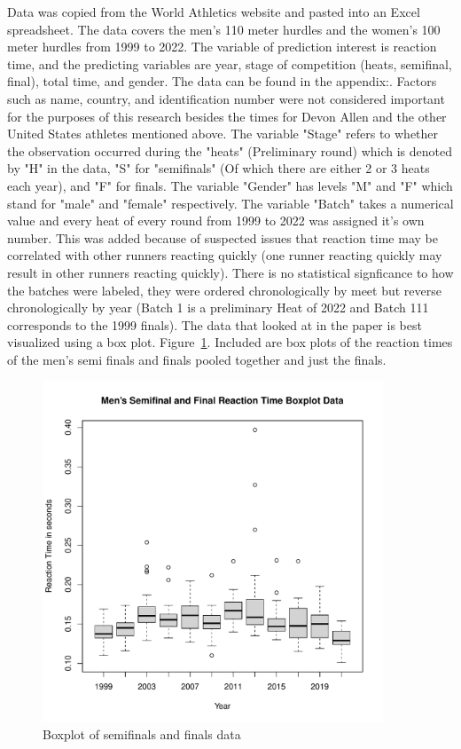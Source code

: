 \documentclass[12pt, letterpaper, titlepage]{article}
\begin{document}
Data was copied from the World Athletics website and pasted into an Excel
spreadsheet. The data covers the men's 110 meter hurdles and the women's 100
meter hurdles from 1999 to 2022.  The variable of prediction interest is reaction
time, and the predicting variables are year, stage of competition (heats, 
semifinal, final), total time, and gender.  The data can be found in the appendix:.  
Factors such as name, country, and identification number were
not considered important for the purposes of this research besides the times for
Devon Allen and the other United States athletes mentioned above.  The variable "Stage"
refers to whether the observation occurred during the "heats" (Preliminary round) which
is denoted by "H" in the data, "S" for "semifinals" (Of which there are either 2 or 3 
heats each year), and "F" for finals. The variable "Gender" has levels "M" and "F" 
which stand for "male" and "female" respectively.  The variable "Batch" takes a 
numerical value and every heat of every round from 1999 to 2022 was assigned it's
own number.  This was added because of suspected issues that reaction time may be
correlated with other runners reacting quickly (one runner reacting quickly may
result in other runners reacting quickly).  There is no statistical signficance to
how the batches were labeled, they were ordered chronologically by meet but
reverse chronologically by year (Batch 1 is a preliminary Heat of 2022 and Batch
111 corresponds to the 1999 finals). The data that looked at in the paper
is best visualized using a box plot. Figure~\ref{fig:DataBoxPlot}.  Included are
box plots of the reaction times of the men's semi finals and finals pooled
together and just the finals.
\begin{figure}[h]
  \centering 
  \includegraphics[width=\textwidth,height=4in]{DataBoxPlot}
  \caption{Boxplot of semifinals and finals data}\label{fig:DataBoxPlot}
\end{figure}
\end{document}
